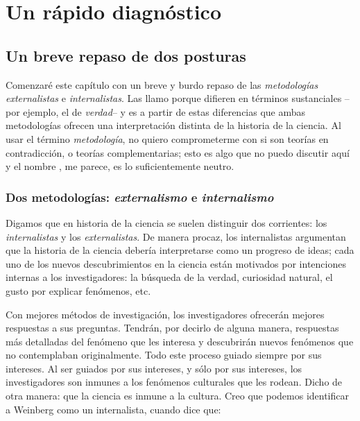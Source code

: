 
\chapter{Un rápido diagnóstico}

\section{Un breve repaso de dos posturas}

\noindent Comenzaré este capítulo con un breve y burdo repaso de las
\emph{metodologías} \emph{externalistas} e \emph{internalistas}. Las
llamo  porque difieren en términos sustanciales --por
ejemplo, el de \emph{verdad}-- y es a partir de estas diferencias que
ambas metodologías ofrecen una interpretación distinta de la historia de
la ciencia. Al usar el término \emph{metodología}, no quiero comprometerme
con si son teorías en contradicción, o teorías complementarias; esto es
algo que no puedo discutir aquí y el nombre , me parece,
es lo suficientemente neutro.



\subsection{Dos metodologías: \emph{externalismo} e \emph{internalismo}}

\noindent Digamos que en historia de la ciencia se suelen distinguir dos
corrientes: los \emph{internalistas} y los \emph{externalistas}. De manera
procaz, los internalistas argumentan que la historia de la ciencia debería
interpretarse como un progreso de ideas; cada uno de los nuevos
descubrimientos en la ciencia están motivados por intenciones internas
a los investigadores: la búsqueda de la verdad, curiosidad natural, el
gusto por explicar fenómenos, etc.

Con mejores métodos de investigación, los investigadores
ofrecerán mejores respuestas a sus preguntas.
Tendrán, por decirlo de alguna manera, respuestas más detalladas del
fenómeno que les interesa y descubrirán nuevos fenómenos que no
contemplaban originalmente. Todo este proceso guiado siempre por sus
intereses. Al ser guiados por sus intereses, y sólo por sus intereses, los
investigadores son inmunes a los fenómenos culturales que les rodean.
Dicho de otra manera: que la ciencia es inmune a la cultura. Creo que
podemos identificar a Weinberg
como un internalista, cuando dice que:

